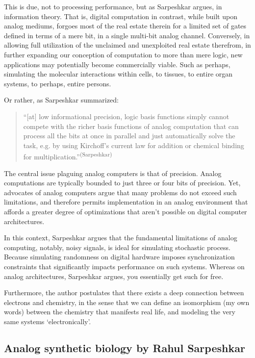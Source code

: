 This is due, not to processing performance, but as Sarpeshkar argues, in information theory. That is, digital computation in contrast, while built upon analog mediums, forgoes most of the real estate therein for a limited set of gates defined in terms of a mere bit, in a single multi-bit analog channel. Conversely, in allowing full utilization of the unclaimed and unexploited real estate therefrom, in further expanding our conception of computation to more than mere logic, new applications may potentially become commercially viable. Such as perhaps, simulating the molecular interactions within cells, to tissues, to entire organ systems, to perhaps, entire persons.

Or rather, as Sarpeshkar summarized:

\begin{quotation}
    ``[at] low informational precision, logic basis functions simply cannot compete with the richer basis functions of analog computation that can process all the bits at once in parallel and just automatically solve the task, e.g. by using Kirchoff’s current law for addition or chemical binding for multiplication.''\textsuperscript{(Sarpeshkar)}
\end{quotation}


The central issue plaguing analog computers is that of precision. Analog computations are typically bounded to just three or four bits of precision. Yet, advocates of analog computers argue that many problems do not exceed such limitations, and therefore permits implementation in an analog environment that affords a greater degree of optimizations that aren't possible on digital computer architectures. 

In this context, Sarpeshkar argues that the fundamental limitations of analog computing, notably, noisy signals, is ideal for simulating stochastic process. Because simulating randomness on digital hardware imposes synchronization constraints that significantly impacts performance on such systems. Whereas on analog architectures, Sarpeshkar argues, you essentially get such for free.

Furthermore, the author postulates that there exists a deep connection between electrons and chemistry, in the sense that we can define an isomorphism (my own words) between the chemistry that manifests real life, and modeling the very same systems `electronically'. 



\subsection{Analog synthetic biology by Rahul Sarpeshkar}

